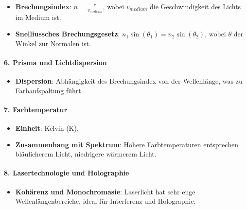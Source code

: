 \documentclass{vorlage-design-main}
\begin{document}
\begin{itemize}

\item
  \textbf{Brechungsindex}: $n = \frac{c}{v_{medium}}$, wobei
  $v_{medium}$ die Geschwindigkeit des Lichts im Medium ist.
\item
  \textbf{Snelliussches Brechungsgesetz}:
  $n_1 \sin(\theta_1) = n_2 \sin(\theta_2)$, wobei $\theta$ der
  Winkel zur Normalen ist.
\end{itemize}

\hypertarget{prisma-und-lichtdispersion}{%
\paragraph{6. Prisma und
Lichtdispersion}\label{prisma-und-lichtdispersion}}

\begin{itemize}

\item
  \textbf{Dispersion}: Abhängigkeit des Brechungsindex von der
  Wellenlänge, was zu Farbaufspaltung führt.
\end{itemize}

\hypertarget{farbtemperatur}{%
\paragraph{7. Farbtemperatur}\label{farbtemperatur}}

\begin{itemize}

\item
  \textbf{Einheit}: Kelvin (K).
\item
  \textbf{Zusammenhang mit Spektrum}: Höhere Farbtemperaturen
  entsprechen bläulicherem Licht, niedrigere wärmerem Licht.
\end{itemize}

\hypertarget{lasertechnologie-und-holographie}{%
\paragraph{8. Lasertechnologie und
Holographie}\label{lasertechnologie-und-holographie}}

\begin{itemize}

\item
  \textbf{Kohärenz und Monochromasie}: Laserlicht hat sehr enge
  Wellenlängenbereiche, ideal für Interferenz und Holographie.
\end{itemize}
\end{document}

